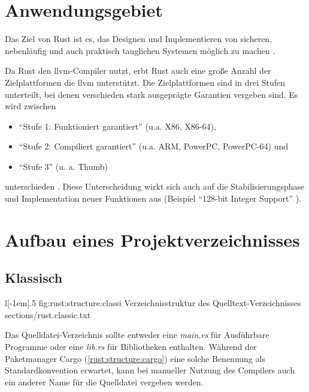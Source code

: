 
\section{Anwendungsgebiet}

Das Ziel von Rust ist es, das Designen und Implementieren von sicheren, nebenläufig und auch praktisch tauglichen Systemen möglich zu machen \cite{rust:faq}.

Da Rust den \gls{llvm}-Compiler nutzt, erbt Rust auch eine große Anzahl der Zielplattformen die \gls{llvm} unterstützt.
Die Zielplattformen sind in drei Stufen unterteilt, bei denen verschieden stark ausgeprägte Garantien vergeben sind. Es wird zwischen
\begin{itemize}
	\item \enquote{Stufe 1: Funktioniert garantiert} (u.a. X86, X86-64),
	\item \enquote{Stufe 2: Compiliert garantiert} (u.a. ARM, PowerPC, PowerPC-64) und
	\item \enquote{Stufe 3} (u. a. Thumb)
\end{itemize}
unterschieden \cite{rust:platform_support}.
Diese Unterscheidung wirkt sich auch auf die Stabilisierungsphase und Implementation neuer Funktionen aus (Beispiel \enquote{128-bit Integer Support} \cite{rust:github:128bit_integer}).

\section{Aufbau eines Projektverzeichnisses}

\subsection{Klassisch}
\label{rust:structure:classic}
\begin{wrapfigure}{l}[-1em]{.5\textwidth}
	\rustcinclude
		{fig:rust:structure:classi}
		{Verzeichnisstruktur des Quelltext-Verzeichnisses}
		{sections/rust.classic.txt}
\end{wrapfigure}

Das Quelldatei-Verzeichnis sollte entweder eine \textit{main.rs} für Ausführbare Programme oder eine \textit{lib.rs} für Bibliotheken enthalten.
Während der Paketmanager Cargo (\autoref{rust:structure:cargo}) eine solche Benennung als Standardkonvention erwartet, kann bei manueller Nutzung des Compilers auch ein anderer Name für die Quelldatei vergeben werden.

